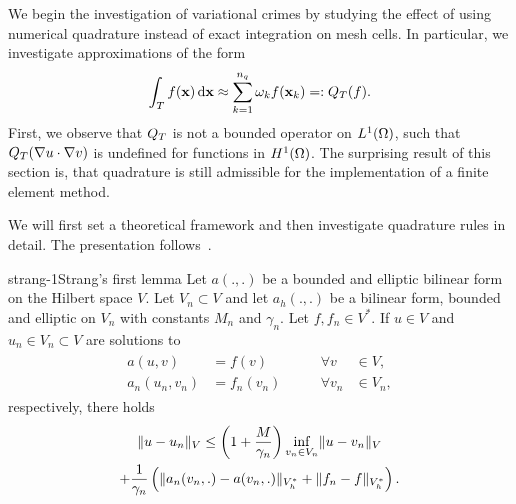 \begin{intro}
  We begin the investigation of variational crimes by studying the
  effect of using numerical quadrature instead of exact integration on
  mesh cells. In particular, we investigate approximations of the form
  \begin{gather}
    \int_T f(\mathbf x)\,\mathrm{d} \mathbf x
    \approx \sum_{k=1}^{n_q} \omega_k f(\mathbf x_k) =: Q_T(f).
  \end{gather}
  First, we observe that $Q_T$ is not a bounded operator on
  $L^1(\Omega)$, such that $Q_T(\nabla u\cdot \nabla v)$ is
  undefined for functions in $H^1(\Omega)$. The surprising result of
  this section is, that quadrature is still admissible for the
  implementation of a finite element method.

  We will first set a theoretical framework and then investigate
  quadrature rules in detail. The presentation follows~\cite[Chapter
  4]{Ciarlet78}.
\end{intro}

\begin{Lemma*}{strang-1}{Strang's first lemma}
  Let $a(.,.)$ be a bounded and elliptic bilinear form on the Hilbert
  space $V$. Let $V_n\subset V$ and let $a_h(.,.)$ be a bilinear form,
  bounded and elliptic on $V_n$ with constants $M_n$ and
  $\gamma_n$. Let $f, f_n\in V^*$. If $u \in V$ and
  $u_n\in V_n \subset V$ are solutions to
  \begin{gather*}
    \begin{aligned}
      a(u,v) &= f(v) & \qquad\forall v&\in V,\\
      a_n(u_n,v_n) &= f_n(v_n) & \qquad\forall v_n&\in V_n,
    \end{aligned}
  \end{gather*}
  respectively, there holds
  \begin{multline}
    \lVert u-u_n\rVert_V \le \left(1+\frac{M}{\gamma_n}\right)
    \inf_{v_n\in V_n}\lVert u-v_n\rVert_V
    \\+ \frac1{\gamma_n}\left(
    \lVert a_n(v_n,.)-a(v_n,.)\rVert_{V_h^*}
         + \lVert f_n-f\rVert_{V_h^*}\right).
  \end{multline}
\end{Lemma*}

